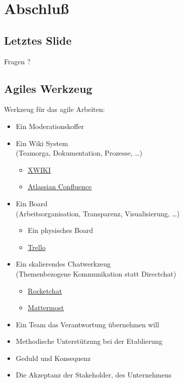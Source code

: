 \section{Abschluß}

\subsection{Letztes Slide}

\frame
{
   \Huge
   \begin{center}
   Fragen ?
   \end{center}
   \normalsize
}

\subsection{Agiles Werkzeug}
\frame
{
  Werkzeug für das agile Arbeiten:
    \bigskip
    \begin{itemize}
      \item{Ein Moderationskoffer}
      \item{Ein Wiki System \\(Teamorga, Dokumentation, Prozesse, \dots)
         \begin{itemize}
            \item{\href{http://www.xwiki.org/xwiki/bin/view/Main/WebHome}{\underline{XWIKI}}}
            \item{\href{https://de.atlassian.com/software/confluence}{\underline{Atlassian Confluence}}}
         \end{itemize}
      }
      \item{Ein Board\\(Arbeitsorganisation, Transparenz, Visualisierung, \dots)
         \begin{itemize}
            \item{Ein physisches Board}
            \item{\href{https://trello.com/}{Trello}}
         \end{itemize}
      }
      \item{Ein skalierendes Chatwerkzeug\\(Themenbezogene Kommunikation statt Directchat)
         \begin{itemize}
            \item{\href{https://rocket.chat/}{Rocketchat}}
            \item{\href{https://about.mattermost.com/}{Mattermost}}
         \end{itemize}
      }
      \item{Ein Team das Verantwortung übernehmen will}
      \item{Methodische Unterstützung bei der Etablierung}
      \item{Geduld und Konsequenz}
      \item{Die Akzeptanz der Stakeholder, des Unternehmens}
    \end{itemize}
}


